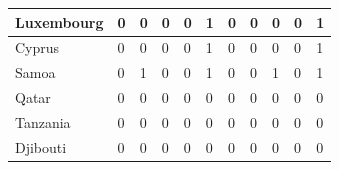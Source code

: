 \documentclass[12pt]{article}  %
\begin{document}
\begin{subappendices}
\begin{longtable}{|l|l|l|l|l|l|l|l|l|l|l|}
	\hline
	Luxembourg                                                     & 0                                                 & 0                                                 & 0                                                 & 0                                                 & 1                                                 & 0                                                 & 0    & 0      & 0      & 1      \\ 
	\hline
	Cyprus                                                         & 0                                                 & 0                                                 & 0                                                 & 0                                                 & 1                                                 & 0                                                 & 0    & 0      & 0      & 1      \\ 
	\hline
	Samoa                                                          & 0                                                 & 1                                                 & 0                                                 & 0                                                 & 1                                                 & 0                                                 & 0    & 1      & 0      & 1      \\ 
	\hline
	Qatar                                                          & 0                                                 & 0                                                 & 0                                                 & 0                                                 & 0                                                 & 0                                                 & 0    & 0      & 0      & 0      \\ 
	\hline
	Tanzania                                                       & 0                                                 & 0                                                 & 0                                                 & 0                                                 & 0                                                 & 0                                                 & 0    & 0      & 0      & 0      \\ 
	\hline
	Djibouti                                                       & 0                                                 & 0                                                 & 0                                                 & 0                                                 & 0                                                 & 0                                                 & 0    & 0      & 0      & 0      \\ 

\end{longtable}
\end{subappendices}
\end{document}
